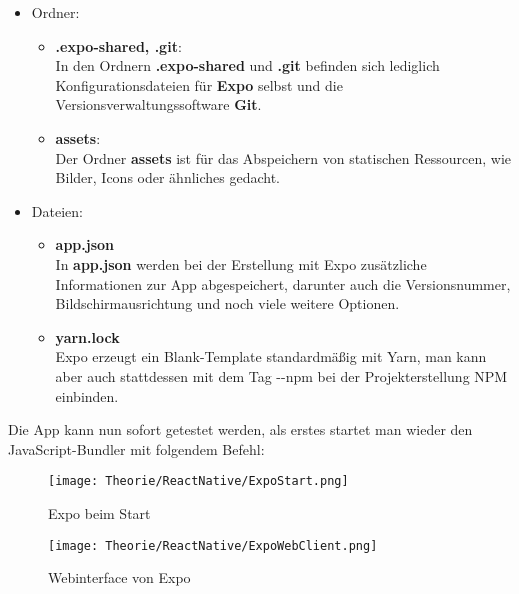\begin{itemize}
\item Ordner:
  \begin{itemize}
  \item \textbf{.expo-shared, .git}:\\
  In den Ordnern \textbf{.expo-shared} und \textbf{.git} befinden sich lediglich Konfigurationsdateien für
  \textbf{Expo} selbst und die Versionsverwaltungssoftware \textbf{Git}.

  \item \textbf{assets}:\\
  Der Ordner \textbf{assets} ist für das Abspeichern von statischen Ressourcen, wie Bilder, Icons oder
  ähnliches gedacht.
  \end{itemize}

\newpage

\item Dateien:
  \begin{itemize}
  \item \textbf{app.json}\\
  In \textbf{app.json} werden bei der Erstellung mit Expo zusätzliche Informationen zur App abgespeichert,
  darunter auch die Versionsnummer, Bildschirmausrichtung und noch viele weitere Optionen.

  \item \textbf{yarn.lock}\\
  Expo erzeugt ein Blank-Template standardmäßig mit Yarn, man kann aber auch stattdessen mit dem
  Tag -{}-npm bei der Projekterstellung NPM einbinden.
  \end{itemize}
\end{itemize}

Die App kann nun sofort getestet werden, als erstes startet man wieder den JavaScript-Bundler
 mit folgendem Befehl:

\begin{figure}[H]
  \begin{center}
    \texttt{[image: Theorie/ReactNative/ExpoStart.png]}
    \caption{Expo beim Start}
  \end{center}
\end{figure}

\begin{figure}[H]
  \begin{center}
    \texttt{[image: Theorie/ReactNative/ExpoWebClient.png]}
    \caption{Webinterface von Expo}
  \end{center}
\end{figure}

